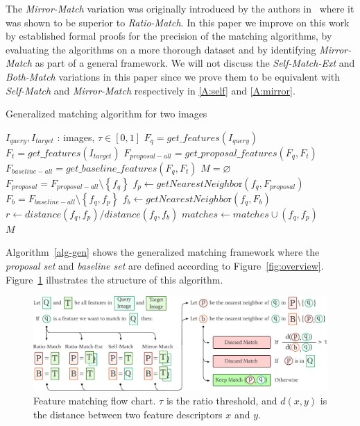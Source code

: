 \documentclass[review]{elsarticle}
\begin{document}
The \emph{Mirror-Match} variation was originally introduced by the authors in~\cite{arnfred2013mirror} where it was shown to be superior to \emph{Ratio-Match}. In this paper we improve on this work by established formal proofs for the precision of the matching algorithms, by evaluating the algorithms on a more thorough dataset and by identifying \emph{Mirror-Match} as part of a general framework. We will not discuss the \emph{Self-Match-Ext} and \emph{Both-Match} variations in this paper since we prove them to be equivalent with \emph{Self-Match} and \emph{Mirror-Match} respectively in \ref{A:self} and \ref{A:mirror}.

\begin{algorithm}[htb]
\caption{Generalized matching algorithm for two images}
\label{alg-gen}
\begin{algorithmic}
    \Require $I_{query}, I_{target}$ : images, $\tau \in [0,1]$
    \State $F_{q} = get\_features(I_{query})$
    \State $F_{t} = get\_features(I_{target})$
\State $F_{proposal-all} = get\_proposal\_features(F_{q}, 
F_{t})$
\State $F_{baseline-all} = get\_baseline\_features(F_{q}, 
F_{t})$
\State $M = \varnothing$
    \State $F_{proposal} = F_{proposal-all} \setminus 
    \left\{f_q\right\}$
    \State $f_p \gets getNearestNeighbo\text{r}(f_q, F_{proposal})$
    \State $F_{b} = F_{baseline-all} \setminus \left\{f_q, 
    f_p\right\}$
    \State $f_b \gets getNearestNeighbo\text{r}(f_q, F_{b})$
    \State $r \gets distance(f_q, f_p) / distance(f_q, f_b)$
        \State $matches \gets matches \cup \left(f_q, f_p\right)$
	\EndIf
\EndFor \\
\Return $M$
\end{algorithmic}
\end{algorithm}

Algorithm~\ref{alg-gen} shows the generalized matching framework where the \emph{proposal set} and \emph{baseline set} are defined according to Figure~\ref{fig:overview}. Figure~\ref{fig:matching} illustrates the structure of this algorithm.


\begin{figure}[htb]
\centering
\includegraphics[width=\columnwidth]{images/matching-wide}
\caption{Feature matching flow chart. $\tau$ 
is the ratio threshold, and $d(x,y)$ is the distance between two feature 
descriptors $x$ and $y$.}
\label{fig:matching}
\end{figure}
%
\end{document}
